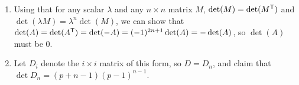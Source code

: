 \documentclass[fleqn,a4paper,11pt]{article}
\begin{document}
\begin{enumerate}[label=\textbf{\arabic*.}]
\begin{proof}
\begin{center}
\begin{tabular}{*4c}
     \end{tabular}
    \end{center}
    In the Leibniz definition of the determinant, the even permutations
    then give the terms
    \({m_{11} m_{22} m_{33}}\),
    \({m_{12} m_{23} m_{31}}\),
    \({m_{13} m_{21} m_{32}}\).
    The odd permutations give the terms
    \(m_{11} m_{23} m_{32}\),
    \(m_{12} m_{21} m_{33}\),
    \(m_{13} m_{22} m_{31}\). So this is indeed the correct formula.
   \end{proof}
   So
   \begin{align*}
    \Delta(x, y, z) =
    \begin{vmatrix}
     x & y & z \\
     z & x & y \\
     y & z & x
    \end{vmatrix}
     &= x^3 + y^3 + z^3 - (xyz + yzx + zxy) \\
     &= x^3 + y^3 + z^3 - 3xyz
   \end{align*}
   But also,
   \begin{alignat*}2
    && \Delta(x, y, z) &= \begin{vmatrix}
     x & y & z \\
     z & x & y \\
     y & z & x
    \end{vmatrix} \\
    \parens*{
     \vec r(1) \to \vec r(1) + \vec r(2) + \vec r(3)
    } \quad
    && &= \begin{vmatrix}
     x + y + z & x + y + z & x + y + z \\
     z & x & y \\
     y & z & x
    \end{vmatrix} \\
    && &= (x + y + z)\begin{vmatrix}
     1 & 1 & 1 \\
     z & x & y \\
     y & z & x
    \end{vmatrix} \\
   \end{alignat*}
  \item
   Using that for any scalar \(\lambda\) and any \(n \times n\) matrix \(M\),
   \(\det(M) = \det(M^{\mathsf T})\) and \(\det(\lambda M) = \lambda^n \det(M)\), we
   can show that
   \(\det(A) = \det(A^{\mathsf T}) = \det(-A) = (-1)^{2n + 1}\det(A) = -\det(A)\), so
   \(\det(A)\) must be \(0\).
  \item
   Let \(D_i\) denote the \(i \times i\) matrix of this form, so \(D = D_n\),
   and claim that
   \(\det D_n = (p + n - 1)(p - 1)^{n - 1}\).


\end{enumerate}
\end{document}
